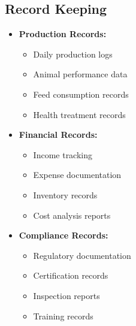 \subsection{Record Keeping}
\begin{itemize}
    \item \textbf{Production Records:}
    \begin{itemize}
        \item Daily production logs
        \item Animal performance data
        \item Feed consumption records
        \item Health treatment records
    \end{itemize}
    
    \item \textbf{Financial Records:}
    \begin{itemize}
        \item Income tracking
        \item Expense documentation
        \item Inventory records
        \item Cost analysis reports
    \end{itemize}
    
    \item \textbf{Compliance Records:}
    \begin{itemize}
        \item Regulatory documentation
        \item Certification records
        \item Inspection reports
        \item Training records
    \end{itemize}
\end{itemize}
